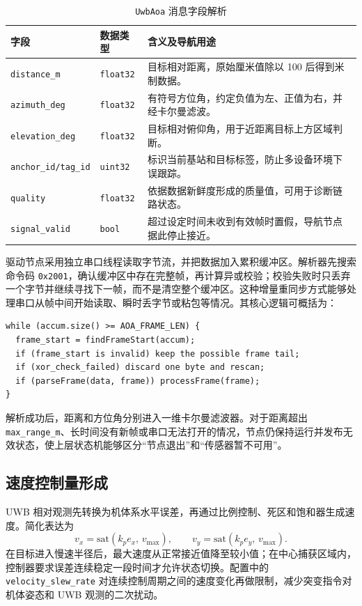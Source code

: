 \documentclass[12pt,a4paper]{ctexart}
\begin{document}
\begin{table}[htbp]
\centering
\caption{\texttt{UwbAoa} 消息字段解析}\label{tab:uwb-message}
{
\begin{tabular}{p{3.3cm}p{3.1cm}p{6.7cm}}
\hline
字段 & 数据类型 & 含义及导航用途 \\
\hline
\texttt{distance\_m} & \texttt{float32} & 目标相对距离，原始厘米值除以 100 后得到米制数据。\\
\texttt{azimuth\_deg} & \texttt{float32} & 有符号方位角，约定负值为左、正值为右，并经卡尔曼滤波。\\
\texttt{elevation\_deg} & \texttt{float32} & 目标相对俯仰角，用于近距离目标上方区域判断。\\
\texttt{anchor\_id/tag\_id} & \texttt{uint32} & 标识当前基站和目标标签，防止多设备环境下误跟踪。\\
\texttt{quality} & \texttt{float32} & 依据数据新鲜度形成的质量值，可用于诊断链路状态。\\
\texttt{signal\_valid} & \texttt{bool} & 超过设定时间未收到有效帧时置假，导航节点据此停止接近。\\
\hline
\end{tabular}
}
\end{table}

驱动节点采用独立串口线程读取字节流，并把数据加入累积缓冲区。解析器先搜索命令码 \texttt{0x2001}，确认缓冲区中存在完整帧，再计算异或校验；校验失败时只丢弃一个字节并继续寻找下一帧，而不是清空整个缓冲区。这种增量重同步方式能够处理串口从帧中间开始读取、瞬时丢字节或粘包等情况。其核心逻辑可概括为：

\begin{verbatim}
while (accum.size() >= AOA_FRAME_LEN) {
  frame_start = findFrameStart(accum);
  if (frame_start is invalid) keep the possible frame tail;
  if (xor_check_failed) discard one byte and rescan;
  if (parseFrame(data, frame)) processFrame(frame);
}
\end{verbatim}

解析成功后，距离和方位角分别进入一维卡尔曼滤波器。对于距离超出 \texttt{max\_range\_m}、长时间没有新帧或串口无法打开的情况，节点仍保持运行并发布无效状态，使上层状态机能够区分“节点退出”和“传感器暂不可用”。

\subsection{速度控制量形成}
UWB 相对观测先转换为机体系水平误差，再通过比例控制、死区和饱和器生成速度。简化表达为
\[
v_x=\mathrm{sat}(k_p e_x,\,v_{\max}),\qquad
v_y=\mathrm{sat}(k_p e_y,\,v_{\max}).
\]
在目标进入慢速半径后，最大速度从正常接近值降至较小值；在中心捕获区域内，控制器要求误差连续稳定一段时间才允许状态切换。配置中的 \texttt{velocity\_slew\_rate} 对连续控制周期之间的速度变化再做限制，减少突变指令对机体姿态和 UWB 观测的二次扰动。
\end{document}
